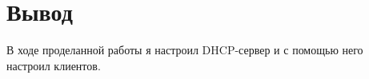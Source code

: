 \chapter{Вывод}
В ходе проделанной работы я настроил DHCP-сервер и с помощью него настроил клиентов.
